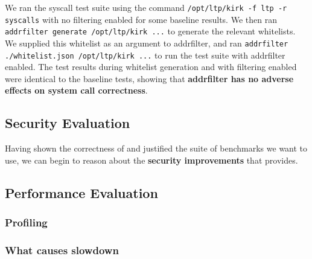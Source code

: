 We ran the syscall test suite using the command \texttt{/opt/ltp/kirk -f ltp -r
syscalls} with no filtering enabled for some baseline results. We then ran
\texttt{addrfilter generate /opt/ltp/kirk ...} to generate the relevant
whitelists. We supplied this whitelist as an argument to addrfilter, and ran
\texttt{addrfilter ./whitelist.json /opt/ltp/kirk ...} to run the test suite
with addrfilter enabled. The test results during whitelist generation and with
filtering enabled were identical to the baseline tests, showing that \textbf{addrfilter
has no adverse effects on system call correctness}.

\subsection{Security Evaluation}

Having shown the correctness of \af and justified the suite of benchmarks
we want to use, we can begin to reason about the \textbf{security improvements}
that \af provides.

\subsection{Performance Evaluation}\label{subsec:perf-eval}

\subsubsection{Profiling}

\subsubsection{What causes slowdown}\label{subsubsec:slowdown}

